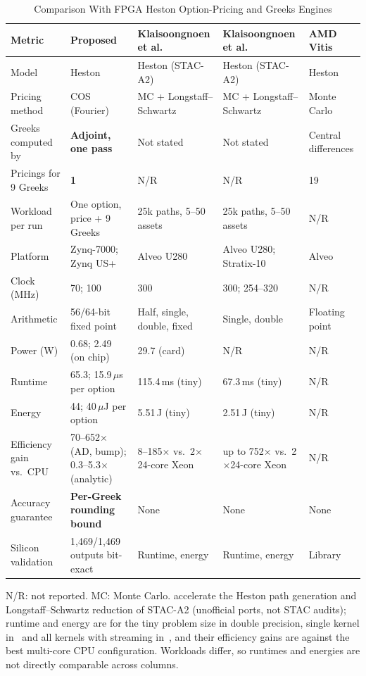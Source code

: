\documentclass[conference]{IEEEtran}
\begin{document}
\begin{table}[!t]
\centering
\caption{Comparison With FPGA Heston Option-Pricing and Greeks Engines}
\label{tab:compare}
\footnotesize
\setlength{\tabcolsep}{3pt}
\begin{tabular}{@{}L{2.8cm}C{3.8cm}C{3.4cm}C{3.4cm}C{2.9cm}@{}}
\toprule
\textbf{Metric} & \textbf{Proposed} & \textbf{Klaisoongnoen et al.~\cite{klai}} & \textbf{Klaisoongnoen et al.~\cite{klaih2rc}} & \textbf{AMD Vitis~\cite{vitisquant}}\\
\midrule
Model & Heston & Heston (STAC-A2) & Heston (STAC-A2) & Heston\\
Pricing method & COS (Fourier) & MC + Longstaff--Schwartz & MC + Longstaff--Schwartz & Monte Carlo\\
Greeks computed by & \textbf{Adjoint, one pass} & Not stated & Not stated & Central differences\\
Pricings for 9 Greeks & \textbf{1} & N/R & N/R & 19\\
Workload per run & One option, price + 9 Greeks & 25k paths, 5--50 assets & 25k paths, 5--50 assets & N/R\\
Platform & Zynq-7000; Zynq US+ & Alveo U280 & Alveo U280; Stratix-10 & Alveo\\
Clock (MHz) & 70; 100 & 300 & 300; 254--320 & N/R\\
Arithmetic & 56/64-bit fixed point & Half, single, double, fixed & Single, double & Floating point\\
Power (W) & 0.68; 2.49 (on chip) & 29.7 (card) & N/R & N/R\\
Runtime & 65.3; 15.9\,$\mu$s per option & 115.4\,ms (tiny) & 67.3\,ms (tiny) & N/R\\
Energy & 44; 40\,$\mu$J per option & 5.51\,J (tiny) & 2.51\,J (tiny) & N/R\\
Efficiency gain vs.\ CPU & 70--652$\times$ (AD, bump); 0.3--5.3$\times$ (analytic) & 8--185$\times$ vs.\ 2$\times$24-core Xeon & up to 752$\times$ vs.\ 2$\times$24-core Xeon & N/R\\
Accuracy guarantee & \textbf{Per-Greek rounding bound} & None & None & None\\
Silicon validation & 1,469/1,469 outputs bit-exact & Runtime, energy & Runtime, energy & Library\\
\bottomrule
\end{tabular}
\par\vspace{2pt}\parbox{\textwidth}{\scriptsize N/R: not reported. MC: Monte Carlo. \cite{klai,klaih2rc} accelerate the Heston path generation and Longstaff--Schwartz reduction of STAC-A2 (unofficial ports, not STAC audits); runtime and energy are for the tiny problem size in double precision, single kernel in~\cite{klai} and all kernels with streaming in~\cite{klaih2rc}, and their efficiency gains are against the best multi-core CPU configuration. Workloads differ, so runtimes and energies are not directly comparable across columns.}
\end{table}
\end{document}
